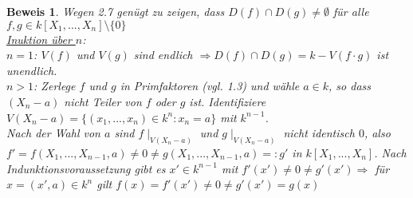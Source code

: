 \documentclass[a4paper,12pt]{report}
\theoremstyle{break}
\theoremstyle{nonumberbreak}
\newtheorem{Bew}{Beweis}
\theoremstyle{nonumberplain}
\begin{document}
\begin{Bew} Wegen 2.7 genügt zu zeigen, dass $D(f)\cap D(g)\neq \emptyset$ für alle $f,g \in k[X_1,...,X_n]\setminus\{0\}$\\
\underline{Inuktion über $n$}:~\\
\underline{$n=1$}: $V(f)$ und $V(g)$ sind endlich $\Rightarrow D(f)\cap D(g)=k-V(f\cdot g)$ ist unendlich.\\
\underline{$n>1$}:  Zerlege $f$ und $g$ in Primfaktoren (vgl. 1.3) und wähle $a\in k$, so dass $(X_n-a)$ nicht Teiler von $f$ oder $g$ ist. Identifiziere $V(X_n-a)= \{(x_1,...,x_n)\in k^n: x_n=a\}$ mit $k^{n-1}$.\\
Nach der Wahl von $a$ sind $f\mid_{V(X_n-a)}$ und $g\mid_{V(X_n-a)}$ nicht identisch $0$, also $f'=f(X_1,...,X_{n-1},a) \neq 0 \neq g(X_1,...,X_{n-1},a)=:g'$ in $k[X_1,...,X_n]$. Nach Indunktionsvoraussetzung gibt es $x'\in k^{n-1}$ mit $f'(x')\neq 0\neq g'(x')\Rightarrow$ für $x=(x',a)\in k^n$ gilt $f(x)=f'(x')\neq 0 \neq g'(x')=g(x)$
\end{Bew}
\end{document}
